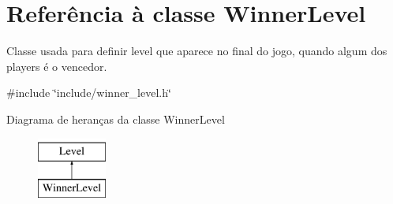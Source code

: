 \hypertarget{classWinnerLevel}{}\section{Referência à classe Winner\+Level}
\label{classWinnerLevel}


Classe usada para definir level que aparece no final do jogo, quando algum dos players é o vencedor.  




{\ttfamily \#include \char`\"{}include/winner\+\_\+level.\+h\char`\"{}}

Diagrama de heranças da classe Winner\+Level\begin{figure}[H]
\begin{center}
\leavevmode
\includegraphics[height=2.000000cm]{classWinnerLevel}
\end{center}
\end{figure}
